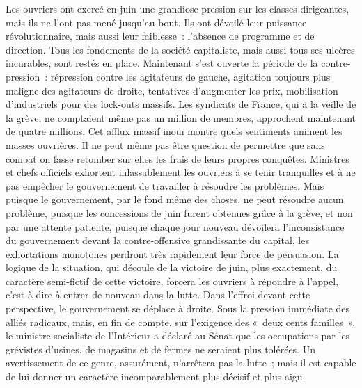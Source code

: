 \documentclass[french,twoside]{book} %
\begin{document}
Les ouvriers ont exercé en juin une grandiose pression sur les classes dirigeantes, mais ils ne l’ont pas mené jusqu’au bout. Ils ont dévoilé leur puissance révolutionnaire, mais aussi leur faiblesse : l’absence de programme et de direction. Tous les fondements de la société capitaliste, mais aussi tous ses ulcères incurables, sont restés en place. Maintenant s’est ouverte la période de la contre-pression : répression contre les agitateurs de gauche, agitation toujours plus maligne des agitateurs de droite, tentatives d’augmenter les prix, mobilisation d’industriels pour des lock-outs massifs. Les syndicats de France, qui à la veille de la grève, ne comptaient même pas un million de membres, approchent maintenant de quatre millions. Cet afflux massif inouï montre quels sentiments animent les masses ouvrières. Il ne peut même pas être question de permettre que sans combat on fasse retomber sur elles les frais de leurs propres conquêtes. Ministres et chefs officiels exhortent inlassablement les ouvriers à se tenir tranquilles et à ne pas empêcher le  gouvernement de travailler à résoudre les problèmes. Mais puisque le gouvernement, par le fond même des choses, ne peut résoudre aucun problème, puisque les concessions de juin furent obtenues grâce à la grève, et non par une attente patiente, puisque chaque jour nouveau dévoilera l’inconsistance du gouvernement devant la contre-offensive grandissante du capital, les exhortations monotones perdront très rapidement leur force de persuasion. La logique de la situation, qui découle de la victoire de juin, plus exactement, du caractère semi-fictif de cette victoire, forcera les ouvriers à répondre à l’appel, c’est-à-dire à entrer de nouveau dans la lutte. Dans l’effroi devant cette perspective, le gouvernement se déplace à droite. Sous la pression immédiate des alliés radicaux, mais, en fin de compte, sur l’exigence des « deux cents familles », le ministre socialiste de l’Intérieur a déclaré au Sénat que les occupations par les grévistes d’usines, de magasins et de fermes ne seraient plus tolérées. Un avertissement de ce genre, assurément, n’arrêtera pas la lutte ; mais il est capable de lui donner un caractère incomparablement plus décisif et plus aigu.\par
\end{document}
